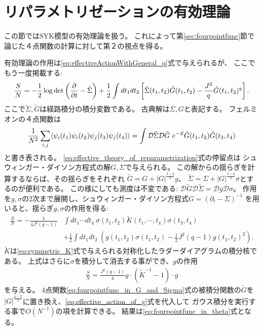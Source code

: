 \section{リパラメトリゼーションの有効理論}
この節ではSYK模型の有効理論を扱う。
これによって第\ref{sec:fourpointfunc}節で論じた４点関数の計算に対して第２の視点を得る。

有効理論の作用は\eqref{eq:effectiveActionWithGeneral_q}式で与えられるが、
ここでもう一度掲載する:
\begin{align}
	\frac{S}{N}
	= -\frac{1}{2}\log\det\left(\frac{\partial}{\partial t} - \tilde{\Sigma}\right)
		+ \frac{1}{2}\int dt_1dt_2
		\left[
			\tilde{\Sigma}(t_1, t_2)\tilde{G}(t_1, t_2)
			- \frac{J^2}{q}\tilde{G}(t_1, t_2)^q
		\right].
	\label{eq:effective_theory_of_reparametrization}
\end{align}
ここで$\tilde{\Sigma},\tilde{G}$は経路積分の積分変数である。
古典解は$\Sigma, G$と表記する。
フェルミオンの４点関数は
\begin{align}
	\frac{1}{N^2}\sum_{i,j}\average{\psi_i(t_1)\psi_i(t_2)\psi_j(t_3)\psi_j(t_4)}
	= \int \mathcal{D}\tilde{\Sigma}\mathcal{D}\tilde{G}\ 
		e^{-S}\tilde{G}(t_1, t_2)\tilde{G}(t_3, t_4)
	\label{eq:fourpointfunc_in_G_and_Sigma}
\end{align}
と書き表される。
\eqref{eq:effective_theory_of_reparametrization}式の停留点は
シュウィンガー・ダイソン方程式の解$G,\Sigma$で与えられる。
この解からの揺らぎを計算するならば、その揺らぎをそれぞれ
$\tilde{G} = G + |G|^{\frac{2-q}{2}}g$、
$\tilde{\Sigma} = \Sigma + |G|^{\frac{2-q}{2}}\sigma$とするのが便利である。
この様にしても測度は不変である: 
$\mathcal{D}\tilde{G}\mathcal{D}\tilde{\Sigma} = \mathcal{D}g\mathcal{D}\sigma$。
作用を$g,\sigma$の2次まで展開し、シュウィンガー・ダイソン方程式$G = (\partial_t - \Sigma)^{-1}$
を用いると、揺らぎ$g,\sigma$の作用を得る:
\begin{align}
	\frac{S}{N}
		= -\frac{1}{4J^2(q-1)}&\int dt_1\cdots dt_4\ 
			\sigma(t_1, t_2)\tilde{K}(t_1, \cdots, t_4)\sigma(t_3, t_4)\nonumber\\
		&+ \frac{1}{2}\int dt_1dt_2\ 
		\left(
			g(t_1, t_2)\sigma(t_1, t_2) - \frac{1}{2}J^2(q-1)g(t_1, t_2)^2
		\right).
\end{align}
$\tilde{K}$は\eqref{eq:symmetric_K}式で与えられる対称化したラダーダイアグラムの積分核である。
上式はさらに$\sigma$を積分して消去する事ができ、$g$の作用
\begin{align}
	\frac{S}{N} = \frac{J^2(q-1)}{4}g\cdot(\tilde{K}^{-1} - 1)\cdot g
	\label{eq:effective_action_of_g}
\end{align}
を与える。
4点関数\eqref{eq:fourpointfunc_in_G_and_Sigma}式の被積分関数の$\tilde{G}$を
$|G|^{\frac{q-2}{2}}$に置き換え、\eqref{eq:effective_action_of_g}式を代入して
ガウス積分を実行する事で$O(N^{-1})$の項を計算できる。
結果は\eqref{eq:fourpointfunc_in_theta}式となる。

